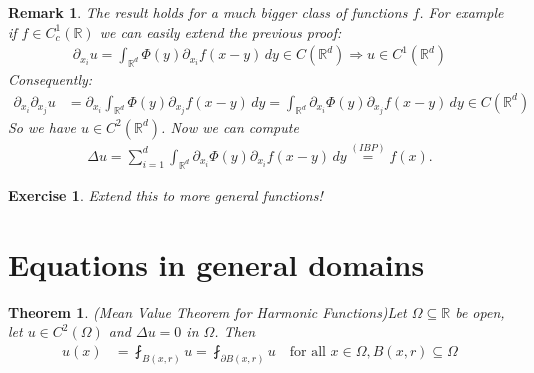 \documentclass{report}
\theoremstyle{tommy}
\newtheorem{thm}[defn]{Theorem}
\newtheorem{rem}[defn]{Remark}
\newtheorem{ex}[defn]{Exercise}
\begin{document}
  \begin{rem}
    The result holds for a much bigger class of functions \(f\). For example if \(f \in C_c^1(\mathbb{R})\) we can easily extend the previous proof:
    \begin{align*}
      \partial_{x_i} u = \int_{\mathbb{R}^d} \Phi(y) \partial_{x_i} f(x-y) \, dy \in C(\mathbb{R}^d) \Rightarrow u \in C^1(\mathbb{R}^d)
    \end{align*}
    Consequently: 
    \begin{align*}
      \partial_{x_i} \partial_{x_j} u 
      &= \partial_{x_i} \int_{\mathbb{R}^d} \Phi(y) \partial_{x_j} f(x-y) \, dy
      = \int_{\mathbb{R}^d} \partial_{x_i} \Phi(y) \partial_{x_j} f(x-y) \, dy \in C(\mathbb{R}^d)
    \end{align*}
    So we have \(u \in C^2(\mathbb{R}^d)\). Now we can compute
    \begin{align*}
      \Delta u = \sum_{i=1}^d \int_{\mathbb{R}^d} \partial_{x_i} \Phi(y) \partial_{x_i} f(x-y) \, dy \overset{(IBP)}{=} f(x).
    \end{align*}
  \end{rem}

  \begin{ex}
    Extend this to more general functions!
  \end{ex}

  \section{Equations in general domains}
  \begin{thm} (Mean Value Theorem for Harmonic Functions)\label{mean-value-theorem} 
    Let \(\Omega \subseteq \mathbb{R}\) be open, let \( u \in C^2(\Omega)\) and \(\Delta u = 0\) in \(\Omega\). Then
    \begin{align*}
      u(x) 
      &= \fint_{B(x, r)} u
      = \fint_{\partial B(x, r)} u \quad \text{for all } x \in \Omega, B(x,r) \subseteq \Omega
    \end{align*}
  \end{thm}
\end{document}
